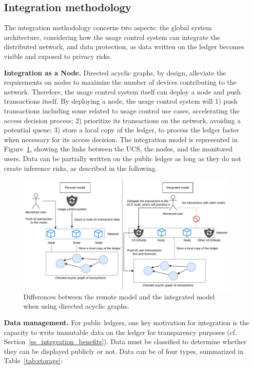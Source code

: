 \subsection{Integration methodology}
\label{ss_integration_methodology}

The integration methodology concerns two aspects: the global system architecture, considering how the usage control system can integrate the distributed network, and data protection, as data written on the ledger becomes visible and exposed to privacy risks.

\textbf{Integration as a Node.}
Directed acyclic graphs, by design, alleviate the requirements on nodes to maximize the number of devices contributing to the network. Therefore, the usage control system itself can deploy a node and push transactions itself. By deploying a node, the usage control system will 1) push transactions including some related to usage control use cases, accelerating the access decision process; 2) prioritize its transactions on the network, avoiding a potential queue; 3) store a local copy of the ledger, to process the ledger faster when necessary for its access decision. The integration model is represented in Figure~\ref{F_peripheral_vs_integrated}, showing the links between the UCS, the nodes, and the monitored users. Data can be partially written on the public ledger as long as they do not create inference risks, as described in the following.

\begin{figure}[t]
\centering
 \includegraphics[width=\textwidth]{Images/remote_vs_integrated.pdf}
\caption{Differences between the remote model and the integrated model when using directed acyclic graphs.}
\label{F_peripheral_vs_integrated}
\end{figure}

\textbf{Data management.}
For public ledgers, one key motivation for integration is the capacity to write immutable data on the ledger for transparency purposes (cf. Section~\ref{ss_integration_benefits}). Data must be classified to determine whether they can be displayed publicly or not. Data can be of four types, summarized in Table~\ref{tab:storage}: 

